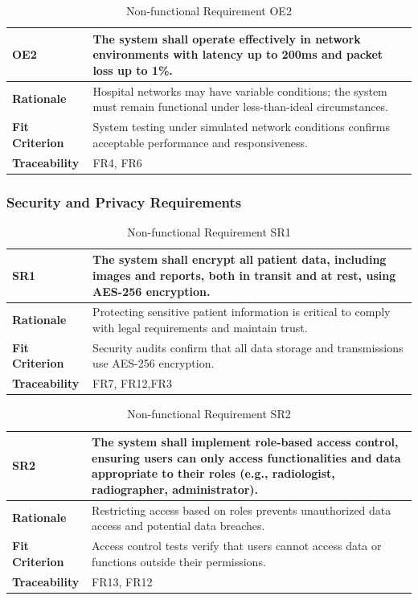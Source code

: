 \documentclass[12pt]{article}
\begin{document}
\begin{table}[h!]
\centering
{}
\begin{tabular}{|p{3.5cm}|p{11.5cm}|}
\hline
\rowcolor{gray!30}
\textbf{OE2} & The system shall operate effectively in network environments with latency up to 200ms and packet loss up to 1\%. \\
\hline
\textbf{Rationale} & Hospital networks may have variable conditions; the system must remain functional under less-than-ideal circumstances. \\
\hline
\textbf{Fit Criterion} & System testing under simulated network conditions confirms acceptable performance and responsiveness. \\
\hline
\textbf{Traceability} & FR4, FR6 \\
\hline
\end{tabular}
\caption{Non-functional Requirement OE2}
\end{table}
\clearpage
\subsubsection{Security and Privacy Requirements}

\begin{table}[h!]
\centering
{}
\begin{tabular}{|p{3.5cm}|p{11.5cm}|}
\hline
\rowcolor{gray!30}
\textbf{SR1} & The system shall encrypt all patient data, including images and reports, both in transit and at rest, using AES-256 encryption. \\
\hline
\textbf{Rationale} & Protecting sensitive patient information is critical to comply with legal requirements and maintain trust. \\
\hline
\textbf{Fit Criterion} & Security audits confirm that all data storage and transmissions use AES-256 encryption. \\
\hline
\textbf{Traceability} & FR7, FR12,FR3 \\
\hline
\end{tabular}
\caption{Non-functional Requirement SR1}
\end{table}

\begin{table}[h!]
\centering
{}
\begin{tabular}{|p{3.5cm}|p{11.5cm}|}
\hline
\rowcolor{gray!30}
\textbf{SR2} & The system shall implement role-based access control, ensuring users can only access functionalities and data appropriate to their roles (e.g., radiologist, radiographer, administrator). \\
\hline
\textbf{Rationale} & Restricting access based on roles prevents unauthorized data access and potential data breaches. \\
\hline
\textbf{Fit Criterion} & Access control tests verify that users cannot access data or functions outside their permissions. \\
\hline
\textbf{Traceability} & FR13, FR12 \\
\hline
\end{tabular}
\caption{Non-functional Requirement SR2}
\end{table}
\end{document}
